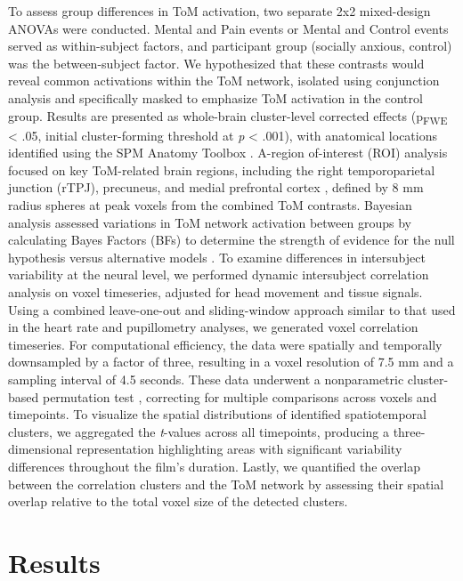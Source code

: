 To assess group differences in ToM activation, two separate 2x2 mixed-design ANOVAs were conducted. Mental and Pain events or Mental and Control events served as within-subject factors, and participant group (socially anxious, control) was the between-subject factor. We hypothesized that these contrasts would reveal common activations within the ToM network, isolated using conjunction analysis and specifically masked to emphasize ToM activation in the control group. Results are presented as whole-brain cluster-level corrected effects (p\textsubscript{FWE} < .05, initial cluster-forming threshold at \textit{p} < .001), with anatomical locations identified using the SPM Anatomy Toolbox \citep{eickhoff2005}. A-region of-interest (ROI) analysis focused on key ToM-related brain regions, including the right temporoparietal junction (rTPJ), precuneus, and medial prefrontal cortex \citep[mPFC; ][]{schurz2014}, defined by 8 mm radius spheres at peak voxels from the combined ToM contrasts. Bayesian analysis assessed variations in ToM network activation between groups by calculating Bayes Factors (BFs) to determine the strength of evidence for the null hypothesis versus alternative models \citep{jasp2022}. 
To examine differences in intersubject variability at the neural level, we performed dynamic intersubject correlation analysis on voxel timeseries, adjusted for head movement and tissue signals. Using a combined leave-one-out and sliding-window approach similar to that used in the heart rate and pupillometry analyses, we generated voxel correlation timeseries. For computational efficiency, the data were spatially and temporally downsampled by a factor of three, resulting in a voxel resolution of 7.5 mm and a sampling interval of 4.5 seconds. These data underwent a nonparametric cluster-based permutation test \citep{mangnus2024BPCNNI}, correcting for multiple comparisons across voxels and timepoints. To visualize the spatial distributions of identified spatiotemporal clusters, we aggregated the \textit{t}-values across all timepoints, producing a three-dimensional representation highlighting areas with significant variability differences throughout the film's duration. Lastly, we quantified the overlap between the correlation clusters and the ToM network by assessing their spatial overlap relative to the total voxel size of the detected clusters.

\section*{Results}

